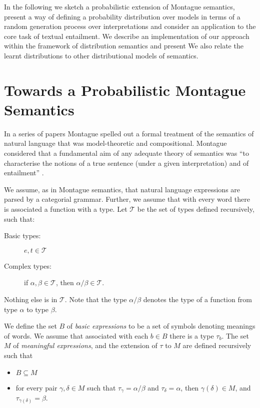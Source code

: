 \documentclass[letterpaper]{article}
\begin{document}
In the following we sketch a probabilistic extension of Montague semantics, present a way of defining a probability distribution over models in terms of a random generation process over interpretations and consider an application to the core task of textual entailment.  We describe an implementation of our approach within the framework of distribution semantics \cite{ref} and present  We also  relate the learnt
distributions to other distributional models of semantics.

\section{Towards a Probabilistic Montague Semantics}

In a series of papers \cite{ug,elf,ptq} Montague spelled out a formal treatment of the semantics of natural language that was model-theoretic and compositional. 
Montague considered that a fundamental aim of any adequate theory of semantics was ``to characterise the notions of a true sentence (under a given interpretation) and of entailment'' \cite{ug}. 

We assume, as in Montague semantics, that natural language expressions
are parsed by a categorial grammar. Further, we assume that with every word there is
associated a function with a type. Let $\mathcal{T}$ be the set of types defined
recursively, such that:
\begin{description}
\item [Basic types:] $e,t\in \mathcal{T}$
\item[Complex types:]  if $\alpha, \beta\in \mathcal{T}$, then $\alpha/\beta\in \mathcal{T}$.
\end{description}
Nothing else is in $\mathcal{T}$. Note that the type $\alpha/\beta$ denotes the type of a function from type
$\alpha$ to type $\beta$.

We define the set $B$ of \emph{basic expressions} to be a set of
symbols denoting meanings of words. We assume that associated with
each $b\in B$ there is a type $\tau_b$. The set $M$ of
\emph{meaningful expressions}, and the extension of $\tau$ to $M$ are
defined recursively such that
\begin{itemize}
\item $B\subseteq M$
\item for every pair $\gamma,\delta\in M$ such that $\tau_\gamma =
  \alpha/\beta$ and $\tau_\delta = \alpha$, then $\gamma(\delta)\in
  M$, and $\tau_{\gamma(\delta)} = \beta$.
\end{itemize}
\end{document}
